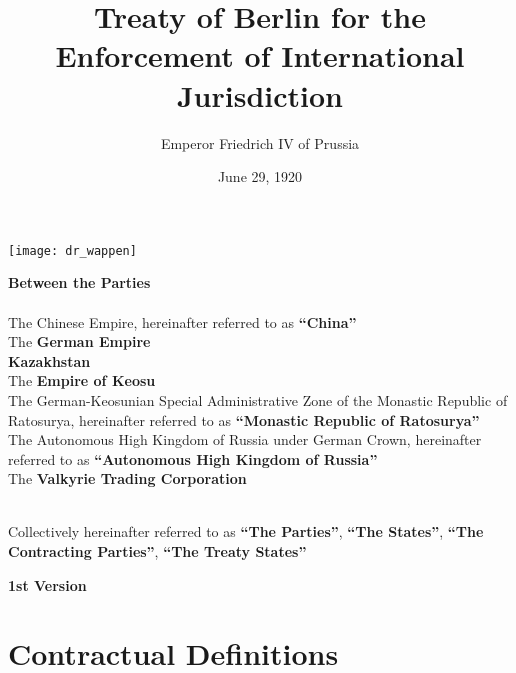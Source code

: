 \documentclass{article}
\title{Treaty of Berlin for the Enforcement of International Jurisdiction}
\author{Emperor Friedrich IV of Prussia}
\date{June 29, 1920}
\begin{document}
\maketitle
\begin{center}
    \texttt{[image: dr\_wappen]}
\end{center}
\begin{center}
    \textbf{Between the Parties\\}\textbf{\\}
    The Chinese Empire, hereinafter referred to as \textbf{``China''\\}
    The \textbf{German Empire\\}
    \textbf{Kazakhstan\\}
    The \textbf{Empire of Keosu\\}
    The German-Keosunian Special Administrative Zone of the Monastic Republic of Ratosurya, hereinafter referred to as \textbf{``Monastic Republic of Ratosurya''\\}
    The Autonomous High Kingdom of Russia under German Crown, hereinafter referred to as \textbf{``Autonomous High Kingdom of Russia''\\}
    The \textbf{Valkyrie Trading Corporation\\}
    \textbf{\\}

    Collectively hereinafter referred to as \textbf{``The Parties''}, \textbf{``The States''}, \textbf{``The Contracting Parties''}, \textbf{``The Treaty States''}
\end{center}
\newpage
{}
\vspace*{\fill}
\begin{Center}
\textbf{1st Version}
\vspace*{\fill}
\end{Center}
\newpage
\tableofcontents
\newpage
\section{Contractual Definitions}
\end{document}
